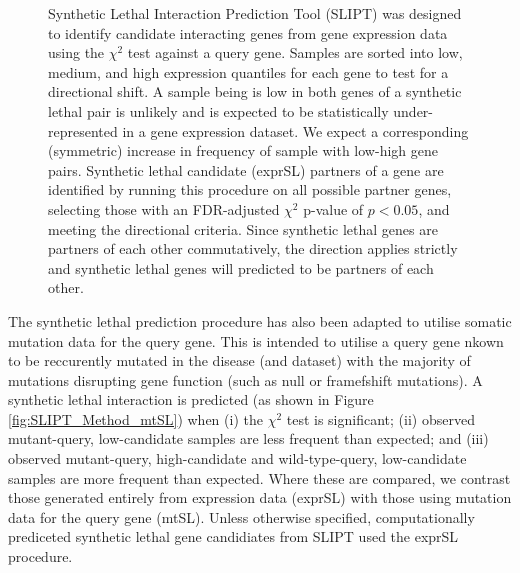 \begin{figure}[!ht]
  \begin{center}
  \resizebox{0.8 \textwidth}{!}{
    
   }
   \end{center}
   \caption[Framework for synthetic lethal prediction]{\textbf{} Synthetic Lethal Interaction Prediction Tool (SLIPT) was designed to identify candidate interacting genes from gene expression data using the $\chi^2$ test against a query gene. Samples are sorted into low, medium, and high expression quantiles for each gene to test for a directional shift. A sample being is low in both genes of a synthetic lethal pair is unlikely and is expected to be statistically under-represented in a gene expression dataset. We expect a corresponding (symmetric) increase in frequency of sample with low-high gene pairs. Synthetic lethal candidate (exprSL) partners of a gene are identified by running this procedure on all possible partner genes, selecting those with an FDR-adjusted $\chi^2$ p-value of $p < 0.05$, and meeting the directional criteria. Since synthetic lethal genes are partners of each other commutatively, the direction applies strictly and synthetic lethal genes will predicted to be partners of each other.
}
\label{fig:SLIPT_Method}
\end{figure}

The synthetic lethal prediction procedure has also been adapted to utilise somatic mutation data for the query gene. This is intended to utilise a query gene nkown to be reccurently mutated in the disease (and dataset) with the majority of mutations disrupting gene function (such as null or framefshift mutations). A synthetic lethal interaction is predicted  (as shown in Figure \ref{fig:SLIPT_Method_mtSL}) when (i) the $\chi^2$ test is significant; (ii) observed mutant-query, low-candidate samples are less frequent than expected; and (iii) observed mutant-query, high-candidate and wild-type-query, low-candidate samples are more frequent than expected. Where these are compared, we contrast those generated entirely from expression data (exprSL) with those using mutation data for the query gene (mtSL). Unless otherwise specified, computationally prediceted synthetic lethal gene candidiates from SLIPT used the exprSL procedure.

